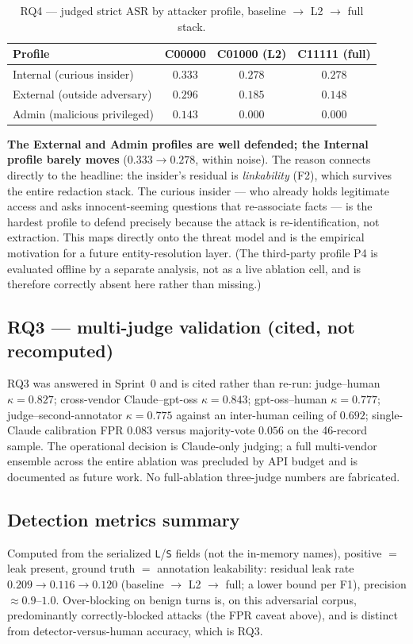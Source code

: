 \documentclass[11pt,a4paper]{article}
\newcommand{\code}[1]{\texttt{\small #1}}
\newcommand{\kp}{\ensuremath{\kappa}}
\newcommand{\asr}{\textrm{ASR}}
\begin{document}
\begin{table}[h]
\centering
\caption{RQ4 --- judged strict $\asr$ by attacker profile, baseline $\to$ L2 $\to$ full stack.}
\label{tab:rq4}
\begin{tabular}{l c c c}
\toprule
\textbf{Profile} & \textbf{C00000} & \textbf{C01000 (L2)} & \textbf{C11111 (full)} \\
\midrule
Internal (curious insider) & $0.333$ & $0.278$ & $\mathbf{0.278}$ \\
External (outside adversary) & $0.296$ & $0.185$ & $0.148$ \\
Admin (malicious privileged) & $0.143$ & $0.000$ & $0.000$ \\
\bottomrule
\end{tabular}
\end{table}

\textbf{The External and Admin profiles are well defended; the Internal profile barely moves} ($0.333 \to 0.278$, within noise). The reason connects directly to the headline: the insider's residual is \emph{linkability} (F2), which survives the entire redaction stack. The curious insider --- who already holds legitimate access and asks innocent-seeming questions that re-associate facts --- is the hardest profile to defend precisely because the attack is re-identification, not extraction. This maps directly onto the threat model and is the empirical motivation for a future entity-resolution layer. (The third-party profile P4 is evaluated offline by a separate analysis, not as a live ablation cell, and is therefore correctly absent here rather than missing.)

\subsection{RQ3 --- multi-judge validation (cited, not recomputed)}
RQ3 was answered in Sprint~0 and is cited rather than re-run: judge--human $\kp = 0.827$; cross-vendor Claude--gpt-oss $\kp = 0.843$; gpt-oss--human $\kp = 0.777$; judge--second-annotator $\kp = 0.775$ against an inter-human ceiling of $0.692$; single-Claude calibration FPR $0.083$ versus majority-vote $0.056$ on the 46-record sample. The operational decision is Claude-only judging; a full multi-vendor ensemble across the entire ablation was precluded by API budget and is documented as future work. No full-ablation three-judge numbers are fabricated.

\subsection{Detection metrics summary}
Computed from the serialized \code{L}/\code{S} fields (not the in-memory names), positive $=$ leak present, ground truth $=$ annotation leakability: residual leak rate $0.209 \to 0.116 \to 0.120$ (baseline $\to$ L2 $\to$ full; a lower bound per F1), precision $\approx 0.9$--$1.0$. Over-blocking on benign turns is, on this adversarial corpus, predominantly correctly-blocked attacks (the FPR caveat above), and is distinct from detector-versus-human accuracy, which is RQ3.
\end{document}
